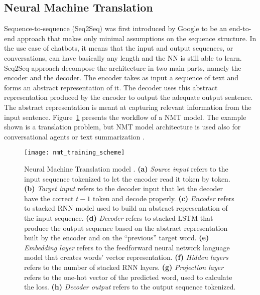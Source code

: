\subsection{Neural Machine Translation}
Sequence-to-sequence (Seq2Seq) \citep{1409.3215} was first introduced by Google to be an end-to-end approach that makes only minimal assumptions on the sequence structure. In the use case of chatbots, it means that the input and output sequences, or conversations, can have basically any length and the NN is still able to learn. Seq2Seq approach decompose the architecture in two main parts, namely the encoder and the decoder. The encoder takes as input a sequence of text and forms an abstract representation of it. The decoder uses this abstract representation produced by the encoder to output the adequate output sentence. The abstract representation is meant at capturing relevant information from the input sentence. Figure~\ref{fig:nmt} presents the workflow of a NMT model. The example shown is a translation problem, but NMT model architecture is used also for conversational agents or text summarization \citep{tensorflow.nmt}.

\begin{figure}
    \centering
    \texttt{[image: nmt\_training\_scheme]}
    \caption{Neural Machine Translation model \citep{tensorflow.nmt}. \textbf{(a)} \textit{Source input} refers to the input sequence tokenized to let the encoder read it token by token. \textbf{(b)} \textit{Target input} refers to the decoder input that let the decoder have the correct $t-1$ token and decode properly. \textbf{(c)} \textit{Encoder} refers to stacked RNN model used to build an abstract representation of the input sequence. \textbf{(d)} \textit{Decoder} refers to stacked LSTM that produce the output sequence based on the abstract representation built by the encoder and on the ``previous'' target word. \textbf{(e)} \textit{Embedding layer} refers to the feedforward neural network language model that creates words' vector representation. \textbf{(f)} \textit{Hidden layers} refers to the number of stacked RNN layers. \textbf{(g)} \textit{Projection layer} refers to the one-hot vector of the predicted word, used to calculate the loss. \textbf{(h)} \textit{Decoder output} refers to the output sequence tokenized.}
    \label{fig:nmt}
\end{figure}

